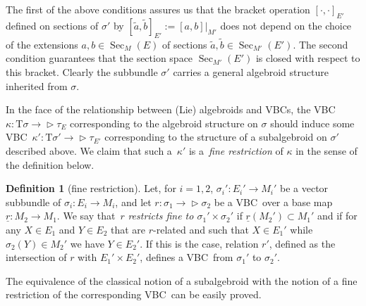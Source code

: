 \documentclass[10pt,a4paper]{amsart}
\newcommand{\ZM}{{VBC}} %
\newcommand{\wt}[1]{\widetilde{#1}} %
\newcommand{\und}{\underline}
\newcommand{\Sec}{\operatorname{Sec}}
\newcommand{\ra}{\rightarrow}
\newcommand{\T}{\mathrm{T}} %
\def\relto{\rightarrow\!\!\vartriangleright} %
\numberwithin{equation}{section}
\theoremstyle{definition}
\newtheorem{df}[thm]{Definition}
\begin{document}
The first of the above conditions assures us that the bracket operation $[\cdot, \cdot]_{E'}$ defined on sections of $\sigma'$ by $[\wt{a}, \wt{b}]_{E'}:= [a, b]|_{M'}$ does not depend on the choice of the extensions $a,b\in \Sec_M(E)$ of sections $\wt{a},\wt{b}\in\Sec_{M'}(E')$. The second condition guarantees that the section space $\Sec_{M'}(E')$ is closed with respect to this bracket.
Clearly the subbundle $\sigma'$ carries a general algebroid structure inherited from $\sigma$.

In the face of the relationship between (Lie) algebroids and \ZM s, the \ZM\ \mbox{$\kappa\colon \T\sigma\!\relto \!\tau_E$} corresponding to the algebroid structure on $\sigma$ should induce some \ZM\ $\kappa'\colon \T\sigma'\relto \tau_{E'}$ corresponding to the structure of a subalgebroid on $\sigma'$ described above. We claim that such a~$\kappa'$ is a~\emph{fine restriction} of $\kappa$ in the sense of the definition below.

\begin{df}[fine restriction] Let, for $i=1,2$, $\sigma_i'\colon E_i'\ra M_i'$ be a vector subbundle of $\sigma_i\colon E_i\ra M_i$, and let $r\colon \sigma_1\relto \sigma_2$ be a \ZM\ over a base map $\und{r}\colon M_2\ra M_1$. We say that~$r$ \emph{restricts fine to $\sigma_1'\times \sigma_2'$} if $\und{r}(M_2')\subset M_1'$ and if for any $X\in E_1$ and $Y\in E_2$ that are $r$-related and such that $X\in E_1'$ while $\sigma_2(Y)\in M_2'$ we have $Y\in E_2'$. If this is the case, relation $r'$, defined as the intersection of $r$ with $E_1'\times E_2'$, defines a \ZM\ from $\sigma_1'$ to $\sigma_2'$.
\end{df}

The equivalence of the classical notion of a subalgebroid with the notion of a fine restriction of the corresponding \ZM\ can be easily proved.
\end{document}
